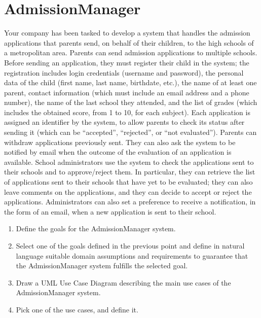 \documentclass[12pt, a4paper]{report}
\begin{document}
    \section{AdmissionManager}
        Your company has been tasked to develop a system that handles the admission applications that parents send, on behalf of their children, to the high schools of a metropolitan
        area. Parents can send admission applications to multiple schools. Before sending an application, they must register their child in the system; the registration includes 
        login credentials (username and password), the personal data of the child (first name, last name, birthdate, etc.), the name of at least one parent, contact information 
        (which must include an email address and a phone number), the name of the last school they attended, and the list of grades (which includes the obtained score, from 1 to 10, 
        for each subject). Each application is assigned an identifier by the system, to allow parents to check its status after sending it (which can be “accepted”, “rejected”, or 
        “not evaluated”). Parents can withdraw applications previously sent. They can also ask the system to be notified by email when the outcome of the evaluation of an application
        is available. School administrators use the system to check the applications sent to their schools and to approve/reject them. In particular, they can retrieve the list of 
        applications sent to their schools that have yet to be evaluated; they can also leave comments on the applications, and they can decide to accept or reject the applications.
        Administrators can also set a preference to receive a notification, in the form of an email, when a new application is sent to their school.
        \begin{enumerate}
            \item Define the goals for the AdmissionManager system.
            \item Select one of the goals defined in the previous point and define in natural language suitable domain assumptions and requirements to guarantee that the 
                AdmissionManager system fulfills the selected goal.
            \item Draw a UML Use Case Diagram describing the main use cases of the AdmissionManager system.
            \item Pick one of the use cases, and define it. 
        \end{enumerate}
\end{document}
